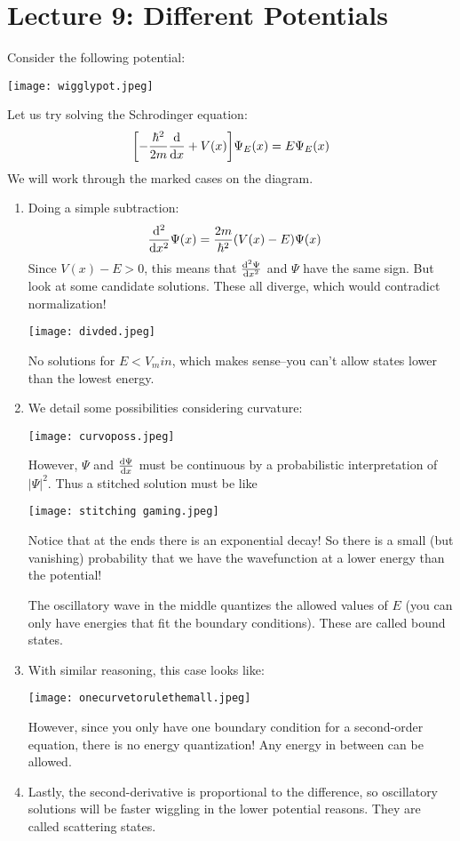 \section{Lecture 9: Different Potentials}

Consider the following potential:

\texttt{[image: wigglypot.jpeg]}

Let us try solving the Schrodinger equation:
\[ \qty[-\frac{\hbar^2}{2m} \derivative{}{x} + V(x)] \Psi_E(x) = E \Psi_E(x) \]
We will work through the marked cases on the diagram.
\begin{enumerate}
    \item Doing a simple subtraction:
    \begin{align*}
        \derivative{^2}{x^2} \Psi(x) &= \frac{2m}{\hbar^2} (V(x) - E) \Psi(x)
    \end{align*}
    Since $V(x) - E > 0$, this means that $\derivative{^2\Psi}{x^2}$ and $\Psi$ have the same sign. But look at some candidate solutions. These
    all diverge, which would contradict normalization!
    
    \texttt{[image: divded.jpeg]}

    No solutions for $E < V_min$, which makes sense--you can't allow states lower than the lowest energy.
    \item We detail some possibilities considering curvature:
    
    \texttt{[image: curvoposs.jpeg]}

    However, $\Psi$ and $\derivative{\Psi}{x}$ must be continuous by a probabilistic interpretation of $|\Psi|^2$. Thus a stitched solution must
    be like 

    \texttt{[image: stitching gaming.jpeg]}

    Notice that at the ends there is an exponential decay! So there is a small (but vanishing) probability that
    we have the wavefunction at a lower energy than the potential!

    The oscillatory wave in the middle quantizes the allowed values of $E$ (you can only have energies that fit the boundary conditions). These are called bound states.

    \item With similar reasoning, this case looks like:
    
    \texttt{[image: onecurvetorulethemall.jpeg]}

    However, since you only have one boundary condition for a second-order equation, there is no energy quantization! Any energy in between can be allowed.

    \item Lastly, the second-derivative is proportional to the difference, so oscillatory solutions will be faster wiggling in the lower potential reasons. They are called scattering states.
\end{enumerate}

